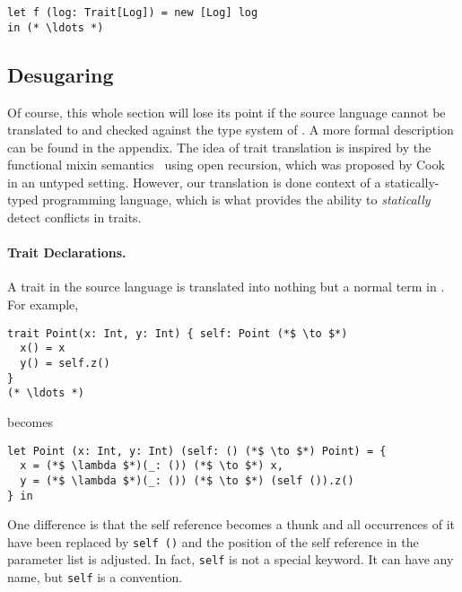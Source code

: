 \begin{lstlisting}
let f (log: Trait[Log]) = new [Log] log
in (* \ldots *)
\end{lstlisting}


\subsection{Desugaring}

Of course, this whole section will lose its point if the source language cannot
be translated to \name and checked against the type system of \name. A more
formal description can be found in the appendix. The idea of trait translation
is inspired by the functional mixin
semantics~\cite{cook1989denotational} using open recursion, which was
proposed by Cook in an untyped setting. However, our translation is done context of a
statically-typed programming language, which is what provides the ability to \emph{statically}
detect conflicts in traits.

\paragraph{Trait Declarations.} A trait in the source language is translated into
nothing but a normal term in \name. For example,

\begin{lstlisting}
trait Point(x: Int, y: Int) { self: Point (*$ \to $*)
  x() = x
  y() = self.z()
}
(* \ldots *)
\end{lstlisting}

\noindent becomes

\begin{lstlisting}
let Point (x: Int, y: Int) (self: () (*$ \to $*) Point) = {
  x = (*$ \lambda $*)(_: ()) (*$ \to $*) x,
  y = (*$ \lambda $*)(_: ()) (*$ \to $*) (self ()).z()
} in
\end{lstlisting}

One difference is that the self reference becomes a thunk and all occurrences of
it have been replaced by \lstinline$self ()$ and the position of the self
reference in the parameter list is adjusted. In fact, \lstinline$self$ is not a
special keyword. It can have any name, but \lstinline$self$ is a
convention.

